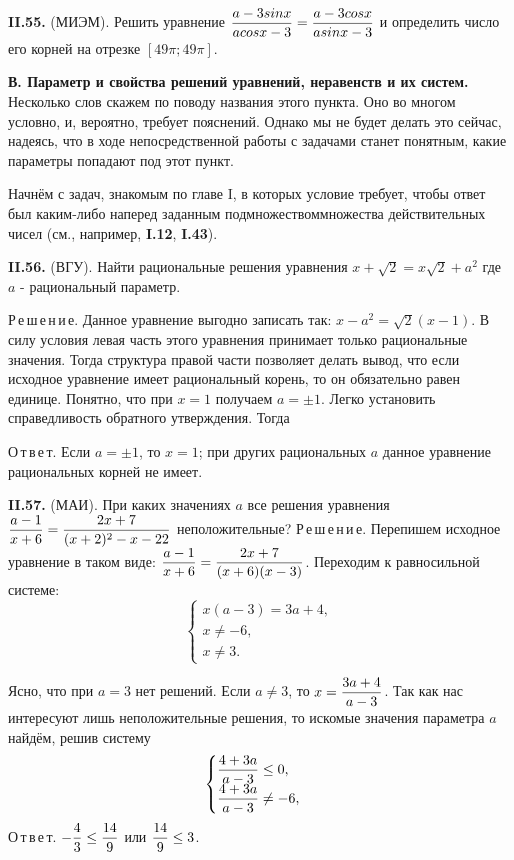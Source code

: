 \documentclass{article}
\begin{document}
 
 
\textbf{II.55.} (МИЭМ). Решить уравнение $\displaystyle {{a - 3sinx}\over{acosx - 3}} = {{a - 3cosx}\over{asinx - 3}}$ и определить число его корней на отрезке $[49\pi; 49\pi]$.
 
\textbf{В. Параметр и свойства решений уравнений, неравенств и их систем.} Несколько слов скажем по поводу названия этого пункта. Оно во многом условно, и, вероятно, требует пояснений. Однако мы не будет делать это сейчас, надеясь, что в ходе непосредственной работы с задачами станет понятным, какие параметры попадают под этот пункт.
 
Начнём с задач, знакомым по главе I, в которых условие требует, чтобы ответ был каким-либо наперед заданным подмножествоммножества действительных чисел (см., например, \textbf{I.12}, \textbf{I.43}).
 
\textbf{II.56.} (ВГУ). Найти рациональные решения уравнения
$x + \sqrt{2} = x\sqrt{2} + a^2 $
где $a$ - рациональный параметр.
 
Р\,е\,ш\,е\,н\,и\,е.  Данное уравнение выгодно записать так:
$x - a^2  = \sqrt{2}(x - 1) $.
В силу условия левая часть этого уравнения принимает только рациональные значения. Тогда структура правой части позволяет делать вывод, что если исходное уравнение имеет рациональный корень, то он обязательно равен единице. Понятно, что при $x = 1$ получаем $a = \pm 1$. Легко установить справедливость обратного утверждения. Тогда
 
О\,т\,в\,е\,т. Если $a = \pm 1$, то $x = 1$; при других рациональных $a$ данное уравнение рациональных корней не имеет.
 
\textbf{II.57.} (МАИ). При каких значениях $a$ все решения уравнения $\displaystyle {{a - 1}\over{x + 6}} = {{2x + 7}\over{(x + 2)^2 - x - 22}}$ неположительные?
Р\,е\,ш\,е\,н\,и\,е.  Перепишем исходное уравнение в таком виде:
 $\displaystyle {{a - 1}\over{x + 6}} = {{2x + 7}\over{(x + 6)(x - 3)}}$.
 Переходим к равносильной системе:
 \begin{equation*}
 \begin{cases}
   x(a - 3) = 3a + 4, 
   \\
   x \ne -6,
   \\
   x \ne 3.
 \end{cases}
\end{equation*}
 
Ясно, что при $a = 3$ нет решений. Если $a \ne 3$, то $\displaystyle x = {{3a + 4}\over{a - 3}} $. Так как нас интересуют лишь неположительные решения, то искомые значения параметра $a$ найдём, решив систему
 \begin{equation*}
 \begin{cases}
  \displaystyle {{4 + 3a}\over{a - 3}} \leq 0, 
   \\
  \displaystyle  {{4 + 3a}\over{a - 3}} \ne -6,
 \end{cases}
\end{equation*}
О\,т\,в\,е\,т. $\displaystyle - {{4}\over{3}} \leq {{14}\over{9}}$ или $\displaystyle {{14}\over{9}} \leq 3$.
 
\end{document}
